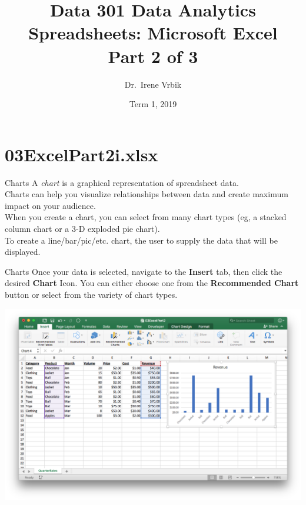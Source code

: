 \documentclass[xcolor=svgnames, handout]{beamer}
\title
  [Data 301 Data Analytics\hspace{2em}]
  {Data 301 Data Analytics\\
  Spreadsheets: Microsoft Excel\\
  Part 2 of 3}
\author
  [Dr.\ Irene Vrbik]
  {Dr.\ Irene Vrbik}
\date
  {Term 1, 2019}
\institute
  {University of British Columbia Okanagan \newline irene.vrbik@ubc.ca}
\begin{document}
\graphicspath{{img/}}


\maketitle



\section
  {03ExcelPart2i.xlsx}



\begin{frame}{Charts}
A \emph{chart} is a graphical representation of spreadsheet data.\\[1em]

Charts can help you visualize relationships between data and create maximum impact on your audience. \\[1em]

When you create a chart, you can select from many chart types (eg, a stacked column chart or a 3-D exploded pie chart). \\[1em]

To create a line/bar/pic/etc. chart, the user to supply the data that will be displayed.\\[1em]
\end{frame}


\begin{frame}{Charts}
Once your data is selected, navigate to the {\bf Insert} tab, then click the desired {\bf Chart} Icon.  You can either choose one from the {\bf Recommended Chart} button or select from the variety of chart types.
 \begin{center}
    \includegraphics[width=.8\textwidth]{barchart}
 \end{center}
 \vspace{-1em}

\end{frame}
\end{document}
